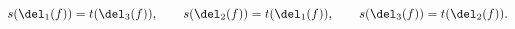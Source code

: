 \begin{equation}
  s(\del_1(f))=t(\del_3(f)),\qquad
  s(\del_2(f))=t(\del_1(f)),\qquad
  s(\del_3(f))=t(\del_2(f)).
\end{equation}

